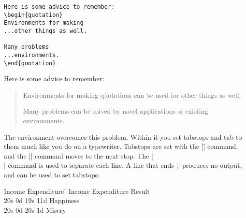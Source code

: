 \newlength{\egwidth}\setlength{\egwidth}{0.48\textwidth}

\newenvironment{ega}%
{\begin{list}{}{\setlength{\leftmargin}{0.02\textwidth}%
\setlength{\rightmargin}{\leftmargin}}\item[]\footnotesize}%
{\end{list}}

\newenvironment{egbox}%
{\begin{minipage}[t]{\egwidth}}%
{\end{minipage}}

\newcommand{\egstart}{\begin{ega}\begin{egbox}}
\newcommand{\egmid}{\end{egbox}\hfill\begin{egbox}}
\newcommand{\egend}{\end{egbox}\end{ega}}


\newcommand{\fn}[1]{\hbox{\tt #1}}
\newcommand{\llo}[1]{(see line #1)}
\newcommand{\lls}[1]{(see lines #1)}


\egstart
\begin{verbatim}
Here is some advice to remember:
\begin{quotation}
Environments for making
...other things as well.

Many problems
...environments.
\end{quotation}
\end{verbatim}
\egmid%
Here is some advice to remember:
\begin{quotation}
Environments for making quotations
can be used for other things as well.

Many problems can be solved by
novel applications of existing
environments.
\end{quotation}
\egend

The  environment overcomes this problem. Within it you set
tabstops and tab to them much like you do on a typewriter.  Tabstops are
set with the |\=| command, and the |\>| command moves to the
next stop.  The
|\\| command is used to separate each line.  A line that ends |\kill|
produces no output, and can be used to set tabstops:


\begin{teX}
\begin{tabbing}
 Income \=Expenditure \= \kill
 Income \>Expenditure \>Result\\
 20s 0d  \>19s 11d \>Happiness\\
 20s 0d  \>20s 1d  \>Misery \\
\end{tabbing}
\end{teX}

